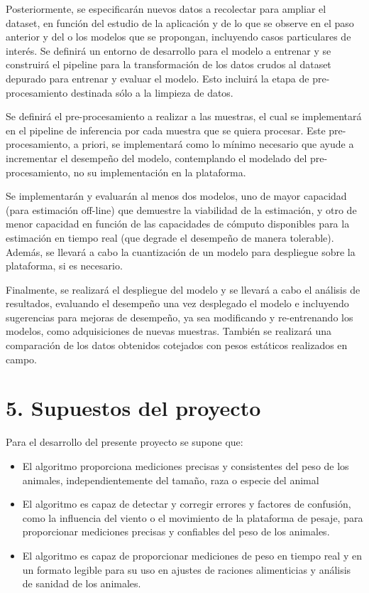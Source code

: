 \documentclass[
11pt, %
codirector, %
]{charter}
\begin{document}
Posteriormente, se especificarán nuevos datos a recolectar para ampliar el dataset, en función del estudio de la aplicación y de lo que se observe en el paso anterior y del o los modelos que se propongan, incluyendo casos particulares de interés. Se definirá un entorno de desarrollo para el modelo a entrenar y se construirá el pipeline para la transformación de los datos crudos al dataset depurado para entrenar y evaluar el modelo. Esto incluirá la etapa de pre-procesamiento destinada sólo a la limpieza de datos.

Se definirá el pre-procesamiento a realizar a las muestras, el cual se implementará en el pipeline de inferencia por cada muestra que se quiera procesar. Este pre-procesamiento, a priori, se implementará como lo mínimo necesario que ayude a incrementar el desempeño del modelo, contemplando el modelado del pre-procesamiento, no su implementación en la plataforma.

Se implementarán y evaluarán al menos dos modelos, uno de mayor capacidad (para estimación off-line) que demuestre la viabilidad de la estimación, y otro de menor capacidad en función de las capacidades de cómputo disponibles para la estimación en tiempo real (que degrade el desempeño de manera tolerable). Además, se llevará a cabo la cuantización de un modelo para despliegue sobre la plataforma, si es necesario.

Finalmente, se realizará el despliegue del modelo y se llevará a cabo el análisis de resultados, evaluando el desempeño una vez desplegado el modelo e incluyendo sugerencias para mejoras de desempeño, ya sea modificando y re-entrenando los modelos, como adquisiciones de nuevas muestras. También se realizará una comparación de los datos obtenidos cotejados con pesos estáticos realizados en campo.

\section{5. Supuestos del proyecto}
\label{sec:supuestos}

Para el desarrollo del presente proyecto se supone que:

\begin{itemize}
	\item El algoritmo proporciona mediciones precisas y consistentes del peso de los animales, independientemente del tamaño, raza o especie del animal
	\item  El algoritmo es capaz de detectar y corregir errores y factores de confusión, como la influencia del viento o el movimiento de la plataforma de pesaje, para proporcionar mediciones precisas y confiables del peso de los animales.
	\item  El algoritmo es capaz de proporcionar mediciones de peso en tiempo real y en un formato legible para su uso en ajustes de raciones alimenticias y análisis de sanidad de los animales.
\end{itemize}
\end{document}

